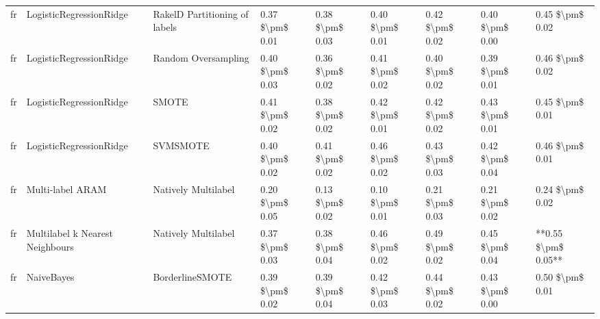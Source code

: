 \begin{tabular}{lllllllll}
      fr &         LogisticRegressionRidge & RakelD Partitioning of labels & 0.37 \$\textbackslash pm\$ 0.01 &           0.38 \$\textbackslash pm\$ 0.03 &       0.40 \$\textbackslash pm\$ 0.01 &        0.42 \$\textbackslash pm\$ 0.02 &                         0.40 \$\textbackslash pm\$ 0.00 &     0.45 \$\textbackslash pm\$ 0.02 \\
      fr &         LogisticRegressionRidge &           Random Oversampling & 0.40 \$\textbackslash pm\$ 0.03 &           0.36 \$\textbackslash pm\$ 0.02 &       0.41 \$\textbackslash pm\$ 0.02 &        0.40 \$\textbackslash pm\$ 0.02 &                         0.39 \$\textbackslash pm\$ 0.01 &     0.46 \$\textbackslash pm\$ 0.02 \\
      fr &         LogisticRegressionRidge &                         SMOTE & 0.41 \$\textbackslash pm\$ 0.02 &           0.38 \$\textbackslash pm\$ 0.02 &       0.42 \$\textbackslash pm\$ 0.01 &        0.42 \$\textbackslash pm\$ 0.02 &                         0.43 \$\textbackslash pm\$ 0.01 &     0.45 \$\textbackslash pm\$ 0.01 \\
      fr &         LogisticRegressionRidge &                      SVMSMOTE & 0.40 \$\textbackslash pm\$ 0.02 &           0.41 \$\textbackslash pm\$ 0.02 &       0.46 \$\textbackslash pm\$ 0.02 &        0.43 \$\textbackslash pm\$ 0.03 &                         0.42 \$\textbackslash pm\$ 0.04 &     0.46 \$\textbackslash pm\$ 0.01 \\
      fr &                Multi-label ARAM &           Natively Multilabel & 0.20 \$\textbackslash pm\$ 0.05 &           0.13 \$\textbackslash pm\$ 0.02 &       0.10 \$\textbackslash pm\$ 0.01 &        0.21 \$\textbackslash pm\$ 0.03 &                         0.21 \$\textbackslash pm\$ 0.02 &     0.24 \$\textbackslash pm\$ 0.02 \\
      fr & Multilabel k Nearest Neighbours &           Natively Multilabel & 0.37 \$\textbackslash pm\$ 0.03 &           0.38 \$\textbackslash pm\$ 0.04 &       0.46 \$\textbackslash pm\$ 0.02 &        0.49 \$\textbackslash pm\$ 0.02 &                         0.45 \$\textbackslash pm\$ 0.04 & **0.55 \$\textbackslash pm\$ 0.05** \\
      fr &                      NaiveBayes &               BorderlineSMOTE & 0.39 \$\textbackslash pm\$ 0.02 &           0.39 \$\textbackslash pm\$ 0.04 &       0.42 \$\textbackslash pm\$ 0.03 &        0.44 \$\textbackslash pm\$ 0.02 &                         0.43 \$\textbackslash pm\$ 0.00 &     0.50 \$\textbackslash pm\$ 0.01 \\

\end{tabular}
